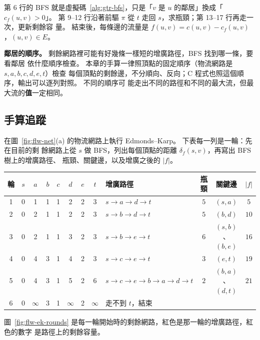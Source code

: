 第 6 行的 BFS 就是虛擬碼~\ref{alg:gtr-bfs}，只是「$v$ 是 $u$ 的鄰居」換成「$c_f(u, v) > 0$」。
第 9--12 行沿著前驅 $\pi$ 從 $t$ 走回 $s$，求瓶頸；第 13--17 行再走一次，更新剩餘容
量。 結束後，每條邊的流量是 $f(u, v) = c(u, v) - c_f(u, v)$，$(u, v) \in E$。

\textbf{鄰居的順序。} 剩餘網路裡可能有好幾條一樣短的增廣路徑，BFS 找到哪一條，要看鄰居
依什麼順序檢查。 本章的手算一律照頂點的固定順序（物流網路是 $s, a, b, c, d, e, t$）檢查
每個頂點的剩餘邊，不分順向、反向；C 程式也照這個順序，輸出可以逐列對照。 不同的順序可
能走出不同的路徑和不同的最大流，但最大流的\textbf{值}一定相同。

\subsection{手算追蹤}
\label{sec:flw-ek-trace}

在圖~\ref{fig:flw-net}(a) 的物流網路上執行 Edmonds--Karp。 下表每一列是一輪：先在目前的剩
餘網路上從 $s$ 做 BFS，列出每個頂點的距離 $\delta_f(s, v)$，再寫出 BFS 樹上的增廣路徑、
瓶頸、關鍵邊，以及增廣之後的 $|f|$。

\begin{center}
\small
\begin{tabular}{c|ccccccc|lccc}
\toprule
輪 & $s$ & $a$ & $b$ & $c$ & $d$ & $e$ & $t$ & 增廣路徑 & 瓶頸 & 關鍵邊 & $|f|$ \\
\midrule
1 & 0 & 1 & 1 & 1 & 2 & 2 & 3 & $s \to a \to d \to t$ & $5$ & $(s, a)$ & $5$ \\
2 & 0 & 2 & 1 & 1 & 2 & 2 & 3 & $s \to b \to d \to t$ & $5$ & $(b, d)$ & $10$ \\
3 & 0 & 2 & 1 & 1 & 3 & 2 & 3 & $s \to b \to e \to t$ & $6$ & $(s, b)$、$(b, e)$ & $16$ \\
4 & 0 & 4 & 3 & 1 & 4 & 2 & 3 & $s \to c \to e \to t$ & $3$ & $(e, t)$ & $19$ \\
5 & 0 & 4 & 3 & 1 & 5 & 2 & 6 & $s \to c \to e \to b \to a \to d \to t$ & $2$ & $(b, a)$、$(d, t)$ & $21$ \\
6 & 0 & $\infty$ & 3 & 1 & $\infty$ & 2 & $\infty$ & 走不到 $t$，結束 & & & \\
\bottomrule
\end{tabular}
\end{center}

圖~\ref{fig:flw-ek-rounds} 是每一輪開始時的剩餘網路，紅色是那一輪的增廣路徑，紅色的數字
是路徑上的剩餘容量。

